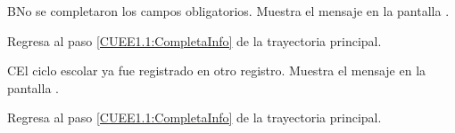 \begin{UCtrayectoriaA}{B}{No se completaron los campos obligatorios.}
	\UCpaso [\UCsist] Muestra el mensaje  en la pantalla .
	
	\UCpaso Regresa al paso \ref{CUEE1.1:CompletaInfo} de la trayectoria principal.
\end{UCtrayectoriaA}

\begin{UCtrayectoriaA}{C}{El ciclo escolar ya fue registrado en otro registro.}
	\UCpaso [\UCsist] Muestra el mensaje  en la pantalla .
	
	\UCpaso Regresa al paso \ref{CUEE1.1:CompletaInfo} de la trayectoria principal.
\end{UCtrayectoriaA}
